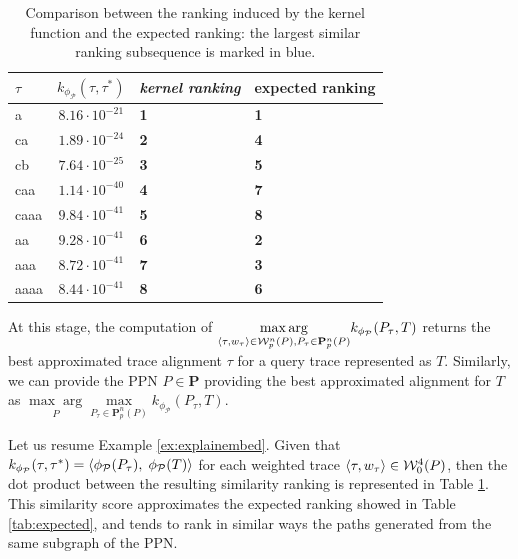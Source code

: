 \begin{table}[!t]
	\caption{Comparison between the ranking induced by the kernel function and the expected ranking: the largest similar ranking subsequence is marked in blue.}\label{tab:rank3}
	\centering
	\begin{tabular}{l|c|ll}
		\toprule
		$\tau$ & $k_{\phi_{\mathcal{P}}}(\tau,\tau^*)$ & \textit{kernel ranking} & expected ranking\\
		\midrule
		a & $8.16\cdot 10^{-21}$ & \textbf{1} & \textbf{\color{blue}1}\\
		ca & $1.89\cdot 10^{-24}$ & \textbf{2} & \textbf{\color{blue}4}\\
		cb & $7.64\cdot 10^{-25}$ & \textbf{3} & \textbf{\color{blue}5}\\
		caa & $1.14\cdot 10^{-40}$ & \textbf{4} & \textbf{\color{blue}7}\\
		caaa & $9.84\cdot 10^{-41}$ & \textbf{5} & \textbf{\color{blue}8}\\
		aa & $9.28\cdot 10^{-41}$ & \textbf{6} & \textbf{\color{red}2}\\
		aaa & $8.72\cdot 10^{-41}$ & \textbf{7} & \textbf{\color{red}3}\\
		aaaa & $8.44\cdot 10^{-41}$ & \textbf{8} & \textbf{\color{red}6}\\
		
		\bottomrule
	\end{tabular}
\end{table}


At this stage, the computation of $\underset{\braket{\tau,w_\tau}\in \mathcal{W}_p^n(P), P_\tau\in\mathbf{P}_p^n(P)}{\max\arg} k_{\phi_\mathcal{P}}(P_\tau, T)$ returns the best approximated trace alignment $\tau$ for a query trace represented as $T$. Similarly, we can provide the PPN $P\in\mathbf{P}$ providing the best approximated alignment for $T$ as $\underset{P}{\max\arg}\underset{ P_\tau\in\mathbf{P}_p^n(P)}{\max} k_{\phi_\mathcal{P}}(P_\tau, T)$. 

\begin{example}
	Let us resume Example \ref{ex:explainembed}. 
	Given that $k_{\phi_{\mathcal{P}}}(\tau,\tau^*)=\braket{\phi_{\mathcal{P}}(P_\tau),\;\phi_{\mathcal{P}}(T)}$ for each weighted trace $\braket{\tau,w_\tau}\in\mathcal{W}_0^4(P)$, then the dot product between the resulting similarity ranking is represented in Table \ref{tab:rank3}. This similarity score approximates the expected ranking showed in Table \ref{tab:expected}, and tends to rank in similar ways the paths generated from the same subgraph of the PPN.
\end{example}


